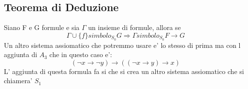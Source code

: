 \documentclass{article}
\begin{document}
        \subsection{Teorema di Deduzione}
        \begin{flushleft}
          Siano F e G formule e sia $\Gamma$ un insieme di formule, allora se
          \begin{equation}
            \Gamma \cup \{f \}simbolo_{S_0} G \Rightarrow \Gamma simbolo_{S_0} F\to G
          \end{equation}
          Un altro sistema assiomatico che potremmo usare e' lo stesso di prima ma con l aggiunta di $A_3$ che in questo caso e':
          \begin{equation}
            (\neg x \to \neg y)\to((\neg x \to y) \to x) 
          \end{equation}
          L' aggiunta di questa formula fa si che si crea un altro sistema assiomatico che si chiamera' $S_1$
        \end{flushleft}
\end{document}
